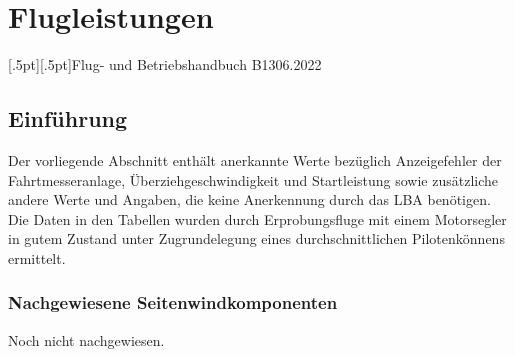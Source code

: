 
\chapter{ Flugleistungen}

[.5pt][.5pt]{\pagemark}{}{\headmark}{Flug- und Betriebshandbuch B13}{}{06.2022}
\pagestyle{Flughandbuch}
\renewcommand*\chapterpagestyle{Flughandbuch}


\section{Einführung}
Der vorliegende Abschnitt enthält anerkannte Werte bezüglich Anzeigefehler der
Fahrtmesseranlage, Überziehgeschwindigkeit und Startleistung sowie zusätzliche
andere Werte und Angaben, die keine Anerkennung durch das LBA benötigen.
Die Daten in den Tabellen wurden durch Erprobungsfluge mit einem Motorsegler
in gutem Zustand unter Zugrundelegung eines durchschnittlichen Pilotenkönnens
ermittelt.

\newpage


\subsection{Nachgewiesene Seitenwindkomponenten}
Noch nicht nachgewiesen.
%
